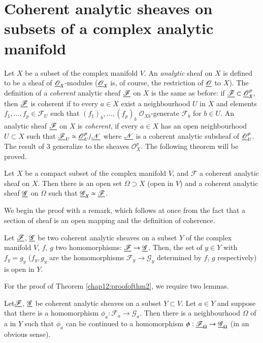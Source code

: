 \section[Coherent analytic sheaves on subsets of a...]{Coherent analytic sheaves on subsets of a complex analytic
  manifold}\label{chap12:sec4}
Let $X$ be a subset of the complex manifold $V$. An \textit{analytic}
sheaf on $X$ is defined to be a sheaf of $\underline{\mathscr{O}}_X$-modules
($\underline{\mathscr{O}}_X$ is, of course, the restriction of
$\underline{\mathscr{O}} $ to $X$). The definition of a \textit{coherent}
analytic sheaf $\underline{\mathscr{F}}$ on $X$ is the same as before: if
$\underline{\mathscr{F}} \subset \underline{\mathscr{O}}^p_X$, then $\underline{\mathscr{F}}$
is coherent if to every $a \in X$ exist a neighbourhood $U$ in $X$ and
elements $f_1, \ldots, f_p \in \mathscr{F}_U$ such that $(f_1)_b,
\ldots, (f_p)_b$ $\mathscr{O}_{Xb}$-generate $\mathscr{F}_b$ for $b
\in U$. An analytic sheaf $\underline{\mathscr{F}}$ on $X$ is
\textit{coherent}, if every $a \in X$ has an open neighbourhood $U
\subset X$ such that $\underline{\mathscr{F}}_U \simeq \underline{\mathscr{O}}^p_U /
\underline{\mathscr{N}}$ where $\underline{\mathscr{N}}$ is a coherent analytic
subsheaf of $\underline{\mathscr{O}}^p_U$. The result of 3 generalize to the
sheaves $\mathscr{O}^p_X$. The following theorem will be proved.

\begin{thm}\label{chap12:thm2}
Let $X$ be a compact subset of the complex manifold $V$, and
$\mathscr{F}$ a coherent analytic sheaf on $X$. Then there is an open
set $\Omega \supset X$ (open in $V$) and a coherent analytic sheaf
$\underline{\mathscr{G}}$  on $\Omega$ such that $\underline{\mathscr{G}}_X \simeq
\underline{\mathscr{F}}$.
\end{thm}

We begin the proof with a remark, which follows at once from the fact
that a section of sheaf is an open mapping and the definition of
coherence.

\begin{remark*}
Let $\underline{\mathscr{F}}$, $\underline{\mathscr{G}}$ be two coherent analytic
sheaves on a subset $Y$ of the complex manifold $V$, $f$, $g$ two
homomorphisms: $\underline{\mathscr{F}} \to \underline{\mathscr{G}}$. Then, the set of
$y \in Y$ with $f_y = g_y$ ($f_y, g_y$ are the homomorphisms
$\mathscr{F}_y \to \mathscr{G}_y$ determined by $f$, $g$ respectively)
is open in $Y$. 
\end{remark*}

For the proof of Theorem \ref{chap12:proofofthm2}, we require two lemmas.

\setcounter{lem}{0}
\begin{lem}\label{chap12:lem1}
Let\pageoriginale $\underline{\mathscr{F}}$, $\underline{\mathscr{G}}$ be coherent
analytic sheaves on a subset $Y \subset V$. Let $a \in Y$ and suppose
that there is a homomorphism $\phi_a : \mathscr{F}_a \to
\mathscr{G}_a$. Then there is a neighbourhood $\Omega$ of a in $Y$
such that $\phi_a$ can be continued to a homomorphism $\phi :
\underline{\mathscr{F}}_\Omega \to \underline{\mathscr{G}}_\Omega$ (in an obvious
sense). 
\end{lem}

